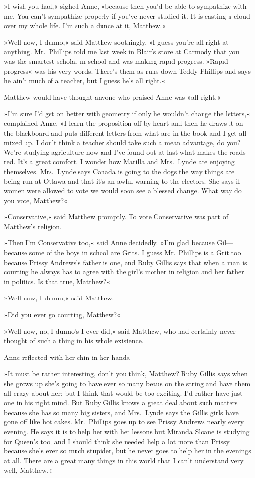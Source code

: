 »I wish you had,« sighed Anne, »because then you'd be able to sympathize with me. You can't sympathize properly if you've never studied it. It is casting a cloud over my whole life. I'm such a dunce at it, Matthew.«

»Well now, I dunno,« said Matthew soothingly. »I guess you're all right at anything. Mr.~Phillips told me last week in Blair's store at Carmody that you was the smartest scholar in school and was making rapid progress. »Rapid progress« was his very words. There's them as runs down Teddy Phillips and says he ain't much of a teacher, but I guess he's all right.«

Matthew would have thought anyone who praised Anne was »all right.«

»I'm sure I'd get on better with geometry if only he wouldn't change the letters,« complained Anne. »I learn the proposition off by heart and then he draws it on the blackboard and puts different letters from what are in the book and I get all mixed up. I don't think a teacher should take such a mean advantage, do you? We're studying agriculture now and I've found out at last what makes the roads red. It's a great comfort. I wonder how Marilla and Mrs.~Lynde are enjoying themselves. Mrs.~Lynde says Canada is going to the dogs the way things are being run at Ottawa and that it's an awful warning to the electors. She says if women were allowed to vote we would soon see a blessed change. What way do you vote, Matthew?«

»Conservative,« said Matthew promptly. To vote Conservative was part of Matthew's religion.

»Then I'm Conservative too,« said Anne decidedly. »I'm glad because Gil—because some of the boys in school are Grits. I guess Mr.~Phillips is a Grit too because Prissy Andrews's father is one, and Ruby Gillis says that when a man is courting he always has to agree with the girl's mother in religion and her father in politics. Is that true, Matthew?«

»Well now, I dunno,« said Matthew.

»Did you ever go courting, Matthew?«

»Well now, no, I dunno's I ever did,« said Matthew, who had certainly never thought of such a thing in his whole existence.

Anne reflected with her chin in her hands.

»It must be rather interesting, don't you think, Matthew? Ruby Gillis says when she grows up she's going to have ever so many beaus on the string and have them all crazy about her; but I think that would be too exciting. I'd rather have just one in his right mind. But Ruby Gillis knows a great deal about such matters because she has so many big sisters, and Mrs.~Lynde says the Gillis girls have gone off like hot cakes. Mr.~Phillips goes up to see Prissy Andrews nearly every evening. He says it is to help her with her lessons but Miranda Sloane is studying for Queen's too, and I should think she needed help a lot more than Prissy because she's ever so much stupider, but he never goes to help her in the evenings at all. There are a great many things in this world that I can't understand very well, Matthew.«

